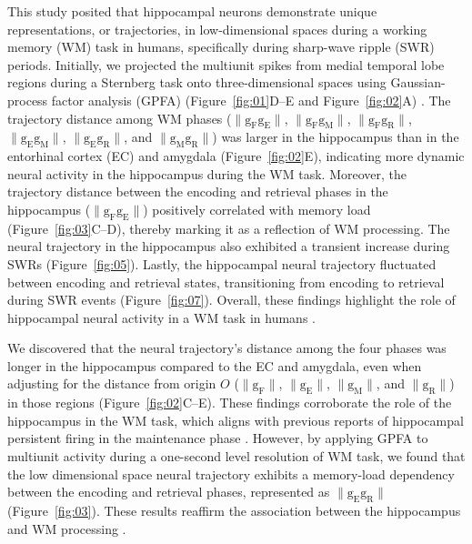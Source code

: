 \documentclass[final,3p,times,twocolumn]{elsarticle}
\begin{document}
This study posited that hippocampal neurons demonstrate unique representations, or trajectories, in low-dimensional spaces during a working memory (WM) task in humans, specifically during sharp-wave ripple (SWR) periods. Initially, we projected the multiunit spikes from medial temporal lobe regions during a Sternberg task onto three-dimensional spaces using Gaussian-process factor analysis (GPFA) (Figure~\ref{fig:01}D--E and Figure~\ref{fig:02}A) \cite{yu_gaussian-process_2009}. The trajectory distance among WM phases ($\mathrm{\lVert g_{F}g_{E} \rVert}$, $\mathrm{\lVert g_{F}g_{M} \rVert}$, $\mathrm{\lVert g_{F}g_{R} \rVert}$, $\mathrm{\lVert g_{E}g_{M} \rVert}$, $\mathrm{\lVert g_{E}g_{R} \rVert}$, and $\mathrm{\lVert g_{M}g_{R} \rVert}$) was larger in the hippocampus than in the entorhinal cortex (EC) and amygdala (Figure~\ref{fig:02}E), indicating more dynamic neural activity in the hippocampus during the WM task. Moreover, the trajectory distance between the encoding and retrieval phases in the hippocampus ($\mathrm{\lVert g_{F}g_{E} \rVert}$) positively correlated with memory load (Figure~\ref{fig:03}C--D), thereby marking it as a reflection of WM processing. The neural trajectory in the hippocampus also exhibited a transient increase during SWRs (Figure~\ref{fig:05}). Lastly, the hippocampal neural trajectory fluctuated between encoding and retrieval states, transitioning from encoding to retrieval during SWR events (Figure~\ref{fig:07}). Overall, these findings highlight the role of hippocampal neural activity in a WM task in humans \cite{naber_reciprocal_2001,van_strien_anatomy_2009,strange_functional_2014}.

We discovered that the neural trajectory's distance among the four phases was longer in the hippocampus compared to the EC and amygdala, even when adjusting for the distance from origin $O$ ($\mathrm{\lVert g_{F} \rVert}$, $\mathrm{\lVert g_{E} \rVert}$, $\mathrm{\lVert g_{M} \rVert}$, and $\mathrm{\lVert g_{R} \rVert}$) in those regions (Figure~\ref{fig:02}C--E). These findings corroborate the role of the hippocampus in the WM task, which aligns with previous reports of hippocampal persistent firing in the maintenance phase \cite{boran_persistent_2019} \cite{kaminski_persistently_2017} \cite{kornblith_persistent_2017} \cite{faraut_dataset_2018}. However, by applying GPFA to multiunit activity during a one-second level resolution of WM task, we found that the low dimensional space neural trajectory exhibits a memory-load dependency between the encoding and retrieval phases, represented as $\mathrm{\lVert g_{E}g_{R} \rVert}$ (Figure~\ref{fig:03}). These results reaffirm the association between the hippocampus and WM processing \cite{oso_boran_2020}.
\end{document}

